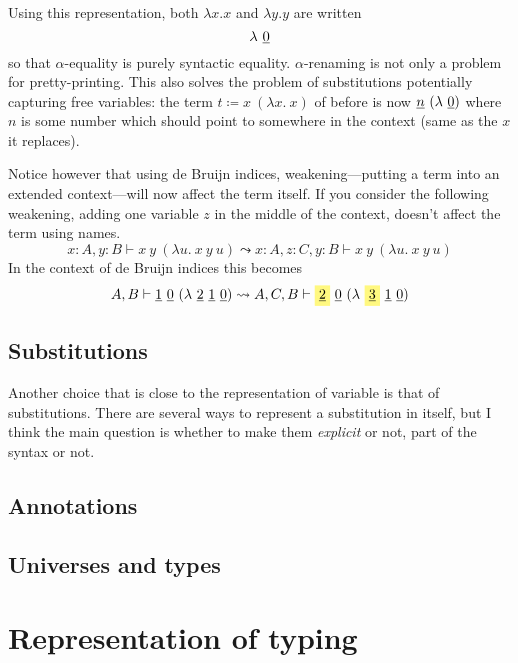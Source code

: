Using this representation, both \(\lambda x.x\) and \(\lambda y.y\) are written
\[
  \lambda\ \underline{0}
\]
so that \(\alpha\)-equality is purely syntactic equality.
\(\alpha\)-renaming is not only a problem for pretty-printing.
This also solves the problem of substitutions potentially capturing free
variables: the term \(t \coloneqq x\ (\lambda x.\ x)\) of before is now
\(\db{n}\ (\lambda\ \db{0})\) where \(n\) is some number which should point to
somewhere in the context (same as the \(x\) it replaces).

Notice however that using de Bruijn indices, weakening---\ie putting a term into
an extended context---will now affect the term itself.
If you consider the following weakening, adding one variable \(z\) in the middle
of the context, doesn't affect the term using names.
\[
  x : A, y : B \vdash x\ y\ (\lambda u.\ x\ y\ u)
  \leadsto
  x : A, z : C, y : B \vdash x\ y\ (\lambda u.\ x\ y\ u)
\]
In the context of de Bruijn indices this becomes
\[
  A, B \vdash \db{1}\ \db{0}\ (\lambda\ \db{2}\ \db{1}\ \db{0})
  \leadsto
  A, C, B \vdash
  \highlight{\db{2}}\ \db{0}\ (\lambda\ \highlight{\db{3}}\ \db{1}\ \db{0})
\]


\subsection{Substitutions}

Another choice that is close to the representation of variable is that of
substitutions. There are several ways to represent a substitution in itself,
but I think the main question is whether to make them \emph{explicit} or not,
\ie part of the syntax or not.

\subsection{Annotations}

\subsection{Universes and types}

\section{Representation of typing}

